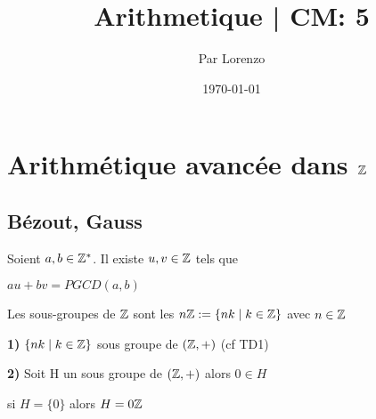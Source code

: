 \documentclass[a4paper, 12pt]{article}
\title{Arithmetique | CM: 5}
\author{Par Lorenzo}
\date{\today}
\begin{document}
\maketitle

\section{Arithmétique avancée dans $\mathbb{Z}$}

\subsection{Bézout, Gauss}

\begin{proposition}[Bézout]
    Soient $a, b \in \mathbb{Z}^*$. Il existe $u, v \in \mathbb{Z}$ tels que

    $au + bv = PGCD(a, b)$
\end{proposition}


\begin{lemme}
    Les sous-groupes de $\mathbb{Z}$ sont les $n\mathbb{Z} := \{nk \mid k \in \mathbb{Z}\}$ avec $n \in \mathbb{Z}$
\end{lemme}

\begin{demonstration}
    \item \textbf{1)} $\{nk \mid k \in \mathbb{Z}\}$ sous groupe de $(\mathbb{Z}, +)$ (cf TD1)
    \item \textbf{2)} Soit H un sous groupe de $(\mathbb{Z}, +)$ alors $0 \in H$
    
    si $H = \{0\}$ alors $H = 0\mathbb{Z}$
\end{demonstration}

\end{document}

